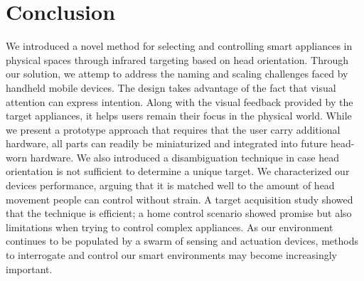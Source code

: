 \section{Conclusion}
We introduced a novel method for selecting and controlling smart appliances in physical spaces through infrared targeting based on head orientation. Through our solution, we attemp to address the naming and scaling challenges faced by handheld mobile devices. The design takes advantage of the fact that visual attention can express intention. Along with the visual feedback provided by the target appliances, it helps users remain their focus in the physical world. While we present a prototype approach that requires that the user carry additional hardware, all parts can readily be miniaturized and integrated into future head-worn hardware. We also introduced a disambiguation technique in case head orientation is not sufficient to determine a unique target. We characterized our devices performance, arguing that it is matched well to the amount of head movement people can control without strain. A target acquisition study showed that the technique is efficient; a home control scenario showed promise but also limitations when trying to control complex appliances. As our environment continues to be populated by a swarm of sensing and actuation devices, methods to interrogate and control our smart environments may become increasingly important.
